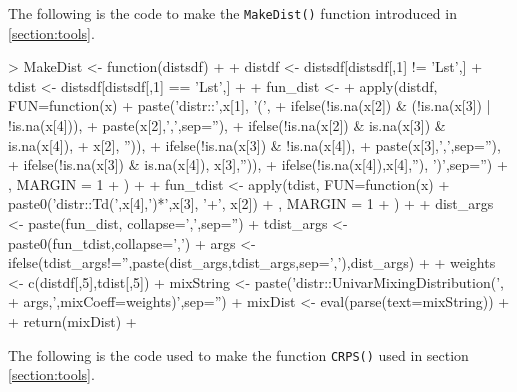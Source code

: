 \documentclass[11pt,notitlepage]{isuthesis}
\begin{document}
\label{section:append}


The following is the code to make the \texttt{MakeDist()} function introduced 
in \ref{section:tools}.
\begin{Schunk}
\begin{Sinput}
> MakeDist <- function(distsdf){
+   
+   distdf <- distsdf[distsdf[,1] != 'Lst',]
+   tdist <- distsdf[distsdf[,1] == 'Lst',]
+   
+   fun_dist <- 
+     apply(distdf, FUN=function(x) {
+       paste('distr::',x[1], '(', 
+             ifelse(!is.na(x[2]) & (!is.na(x[3]) | !is.na(x[4])),
+                    paste(x[2],',',sep=''),
+                    ifelse(!is.na(x[2]) & is.na(x[3]) & is.na(x[4]),
+                           x[2], '')), 
+             ifelse(!is.na(x[3]) & !is.na(x[4]),
+                    paste(x[3],',',sep=''),
+                    ifelse(!is.na(x[3]) & is.na(x[4]), x[3],'')), 
+             ifelse(!is.na(x[4]),x[4],''), ')',sep='')
+     }, MARGIN = 1
+     )
+   
+   fun_tdist <- apply(tdist, FUN=function(x) {
+     paste0('distr::Td(',x[4],')*',x[3], '+', x[2])
+   }, MARGIN = 1
+   )
+   
+   dist_args <- paste(fun_dist, collapse=',',sep='')
+   tdist_args <- paste0(fun_tdist,collapse=',')
+   args <- ifelse(tdist_args!='',paste(dist_args,tdist_args,sep=','),dist_args)
+   
+   weights <- c(distdf[,5],tdist[,5])
+   mixString <- paste('distr::UnivarMixingDistribution(',
+                      args,',mixCoeff=weights)',sep='')
+   mixDist <- eval(parse(text=mixString))
+   
+   return(mixDist)
+ }
\end{Sinput}
\end{Schunk}


The following is the code used to make the function \texttt{CRPS()} used in
section \ref{section:tools}.
\begin{Schunk}
\end{Schunk}






\clearpage
\pagebreak

%
\end{document}
